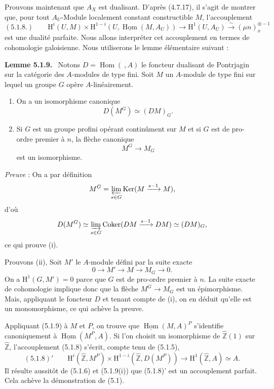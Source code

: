 \documentclass[11pt]{article}
\newenvironment{statement}[1]{\par\medskip\noindent\textbf{#1.}\ }{\par\medskip}
\renewcommand{\H}{\mathrm{H}}
\DeclareMathOperator{\Hom}{Hom}
\newcommand{\Z}{\mathbb{Z}}
\providecommand{\Ker}{\operatorname{Ker}}
\providecommand{\Coker}{\operatorname{Coker}}
\providecommand{\uHom}{\underline{\Hom}}
\providecommand{\Hom}{\operatorname{Hom}}
\providecommand{\Ker}{\operatorname{Ker}}
\providecommand{\Coker}{\operatorname{Coker}}
\providecommand{\Ker}{\operatorname{Ker}}
\providecommand{\Coker}{\operatorname{Coker}}
\providecommand{\Z}{\mathbb Z}
\providecommand{\Hom}{\operatorname{Hom}}
\begin{document}
Prouvons maintenant que $A_X$ est dualisant. D'après (4.7.17), il s'agit de montrer que, pour tout $A_U$-Module localement constant constructible $M$, l'accouplement
\[
(5.1.8.)\qquad \H^i(U,M)\times\H^{1-i}(U,\uHom(M,A_U))\longrightarrow \H^1(U,A_U)\xrightarrow{\sim}(\mu n)_x^{\otimes -1}
\]
est une dualité parfaite. Nous allons interpréter cet accouplement en termes de cohomologie galoisienne. Nous utiliserons le lemme élémentaire suivant :

\begin{statement}{Lemme 5.1.9}
Notons $D=\Hom(\ ,A)$ le foncteur dualisant de Pontrjagin sur la catégorie des $A$-modules de type fini. Soit $M$ un $A$-module de type fini sur lequel un groupe $G$ opère $A$-linéairement.
\begin{enumerate}[label=(\roman*)]
\item On a un isomorphisme canonique
\[
D(M^G)\simeq (DM)_G.
\]
\item Si $G$ est un groupe profini opérant continûment sur $M$ et si $G$ est de pro-ordre premier à $n$, la flèche canonique
\[
M^G\longrightarrow M_G
\]
est un isomorphisme.
\end{enumerate}
\end{statement}

\emph{Preuve} : On a par définition
\[
M^G=\varprojlim_{s\in G}\Ker(M\xrightarrow{s-1}M),
\]
d'où
\[
D(M^G)\simeq \varinjlim_{s\in G}\Coker(DM\xrightarrow{s-1}DM)\simeq (DM)_G,
\]
ce qui prouve (i).

Prouvons (ii), Soit $M'$ le $A$-module défini par la suite exacte
\[
0\longrightarrow M'\longrightarrow M\longrightarrow M_G\longrightarrow0.
\]
On a $\H^1(G,M')=0$ parce que $G$ est de pro-ordre premier à $n$. La suite exacte de cohomologie implique donc que la flèche $M^G\to M_G$ est un épimorphisme. Mais, appliquant le foncteur $D$ et tenant compte de (i), on en déduit qu'elle est un monomorphisme, ce qui achève la preuve.

Appliquant (5.1.9) à $M$ et $P$, on trouve que $\uHom(M,A)^P$ s'identifie canoniquement à $\uHom(M^P,A)$. Si l'on choisit un isomorphisme de $\widehat{\Z}(1)$ sur $\widehat{\Z}$, l'accouplement (5.1.8) s'écrit, compte tenu de (5.1.5),
\[
(5.1.8)'\qquad \H^i(\widehat{\Z},M^P)\times\H^{1-i}(\widehat{\Z},D(M^P))\longrightarrow\H^1(\widehat{\Z},A)\simeq A.
\]
Il résulte aussitôt de (5.1.6) et (5.1.9(i)) que (5.1.8)' est un accouplement parfait. Cela achève la démonstration de (5.1).

\end{document}
